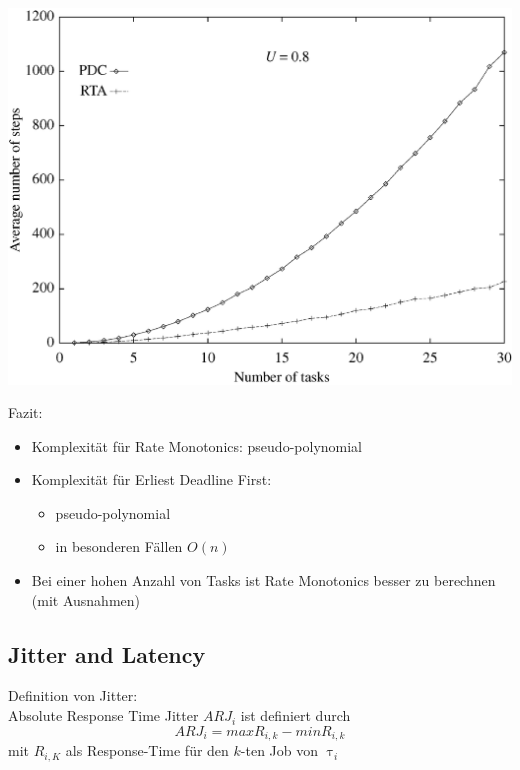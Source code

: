 \begin{frame}{\subsecname}
	\begin{center}
		\includegraphics[scale=.25]{graphics/vergleich/rtapdc.png}	
	\end{center}
\end{frame}

\begin{frame}{\subsecname}
	Fazit:
	\begin{itemize}
		\item Komplexität für Rate Monotonics: pseudo-polynomial
		\item Komplexität für Erliest Deadline First:
		\begin{itemize}
			\item pseudo-polynomial
			\item in besonderen Fällen $O(n)$
		\end{itemize}
		\item Bei einer hohen Anzahl von Tasks ist Rate Monotonics besser zu berechnen (mit Ausnahmen)
	\end{itemize}
\end{frame}



\subsection{Jitter and Latency}

\begin{frame}{\subsecname}
	Definition von Jitter:\\
	Absolute Response Time Jitter $ARJ_i$ ist definiert durch
	\begin{equation}
		ARJ_i=max R_{i,k}-min R_{i,k}
	\end{equation} mit
	$R_{i,K}$ als Response-Time für den $k$-ten Job von $\uptau_i$
\end{frame}

